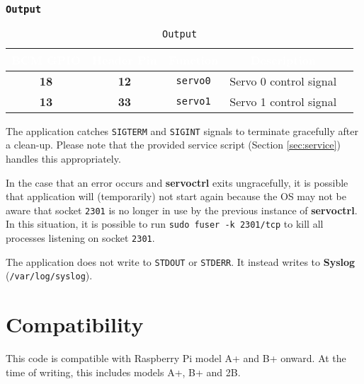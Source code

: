    \subsubsection{\texttt{Output}}
   \begin{table}[!htb]
      \begin{center}
         \begin{tabular}{|c|c|c|c|c|}
            \rowcolor{black}
            \textcolor{white}{\textbf{BCM GPIO}}  &
            \textcolor{white}{\textbf{Header Pin}} &
            \textcolor{white}{\textbf{Function}} &
            \textcolor{white}{\textbf{Description}}\\
            \hline
            \hline
            \textbf{18} & \textbf{12} &
               \texttt{servo0} & Servo 0 control signal \\
            \hline
            \textbf{13} & \textbf{33} &
               \texttt{servo1} & Servo 1 control signal \\
            \hline
         \end{tabular}
         \caption{\texttt{Output}}
         \label{table:output}
      \end{center}
   \end{table}

The application catches \texttt{SIGTERM} and \texttt{SIGINT} signals to
terminate gracefully after a clean-up. Please note that the provided service
script (Section \ref{sec:service}) handles this appropriately.

In the case that an error occurs and \textbf{servoctrl} exits ungracefully, it
is possible that application will (temporarily) not start again because the OS
may not be aware that socket \texttt{2301} is no longer in use by the previous
instance of \textbf{servoctrl}. In this situation, it is possible to run
\texttt{sudo fuser -k 2301/tcp} to kill all processes listening on socket
\texttt{2301}.

The application does not write to \texttt{STDOUT} or \texttt{STDERR}. It instead
writes to \textbf{Syslog} (\texttt{/var/log/syslog}).

\section{Compatibility}
This code is compatible with Raspberry Pi model A+ and B+ onward. At the time of
writing, this includes models A+, B+ and 2B.

